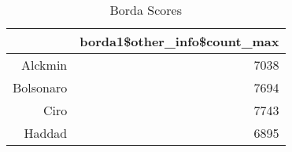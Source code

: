 \begin{table}[ht]
\centering
\begin{tabular}{rr}
  \hline
 & borda1\$other\_info\$count\_max \\ 
  \hline
Alckmin & 7038 \\ 
  Bolsonaro & 7694 \\ 
  Ciro & 7743 \\ 
  Haddad & 6895 \\ 
   \hline
\end{tabular}
\caption{Borda Scores } 
\label{tbl:subtab2}
\end{table}
